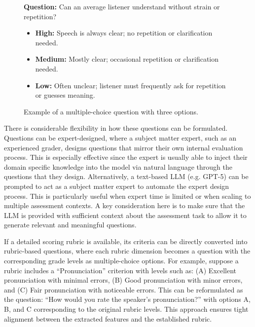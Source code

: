 \documentclass{report}
\begin{document}
\begin{figure}[h]
  \centering
  \begin{tcolorbox}[
    colback=white,
    colframe=black,
    boxrule=0.8pt,
    arc=4pt,
    width=0.9\linewidth,
    sharp corners=south,
    title=Example Question
  ]
    \textbf{Question:} Can an average listener understand without strain or repetition?
    \begin{itemize}
      \item \textbf{High:} Speech is always clear; no repetition or clarification needed.
      \item \textbf{Medium:} Mostly clear; occasional repetition or clarification needed.
      \item \textbf{Low:} Often unclear; listener must frequently ask for repetition or guesses meaning.
    \end{itemize}
  \end{tcolorbox}
  \caption{Example of a multiple-choice question with three options.}
  \label{fig:example_question}
\end{figure}

There is considerable flexibility in how these questions can be formulated. Questions can be expert-designed, where a subject matter expert, such as an experienced grader, designs questions that mirror their own internal evaluation process. This is especially effective since the expert is usually able to inject their domain specific knowledge into the model via natural language through the questions that they design. Alternatively, a text-based LLM (e.g. GPT-5) can be prompted to act as a subject matter expert to automate the expert design process. This is particularly useful when expert time is limited or when scaling to multiple assessment contexts. A key consideration here is to make sure that the LLM is provided with sufficient context about the assessment task to allow it to generate relevant and meaningful questions.

If a detailed scoring rubric is available, its criteria can be directly converted into rubric-based questions, where each rubric dimension becomes a question with the corresponding grade levels as multiple-choice options. For example, suppose a rubric includes a ``Pronunciation'' criterion with levels such as: (A) Excellent pronunciation with minimal errors, (B) Good pronunciation with minor errors, and (C) Fair pronunciation with noticeable errors. This can be reformulated as the question: ``How would you rate the speaker's pronunciation?'' with options A, B, and C corresponding to the original rubric levels. This approach ensures tight alignment between the extracted features and the established rubric.
\end{document}
